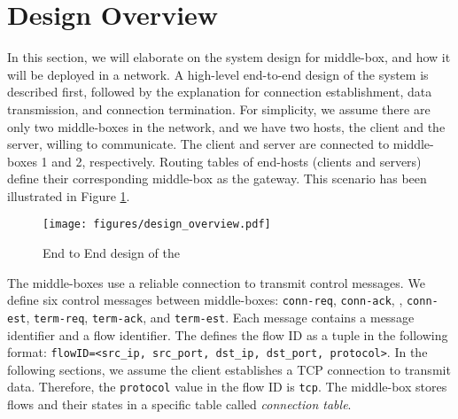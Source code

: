 \section{Design Overview}
\label{sec:design}
In this section, we will elaborate on the system design for {\sys} middle-box, and how it will be deployed in a network.
A high-level end-to-end design of the system is described first, followed by the explanation for connection establishment, data transmission, and connection termination.
For simplicity, we assume there are only two middle-boxes in the network, and we have two hosts, the client and the server, willing to communicate.
The client and server are connected to middle-boxes 1 and 2, respectively.
Routing tables of end-hosts (clients and servers) define their corresponding middle-box as the gateway.
This scenario has been illustrated in Figure \ref{fig:end-to-end}.

\begin{figure}[!htbp]
    \centering
    \texttt{[image: figures/design\_overview.pdf]}
    \caption{End to End design of the {\sys}}
    \label{fig:end-to-end}
\end{figure}

The {\sys} middle-boxes use a reliable connection to transmit control messages.
We define six control messages between middle-boxes: \texttt{conn-req}, \texttt{conn-ack}, , \texttt{conn-est}, \texttt{term-req}, \texttt{term-ack}, and \texttt{term-est}.
Each message contains a message identifier and a flow identifier. 
The {\sys} defines the flow ID as a tuple in the following format: \texttt{flowID=<src\_ip, src\_port, dst\_ip, dst\_port, protocol>}.
In the following sections, we assume the client establishes a TCP connection to transmit data.
Therefore, the \texttt{protocol} value in the flow ID is \texttt{tcp}.
The middle-box stores flows and their states in a specific table called \textit{connection table}.

